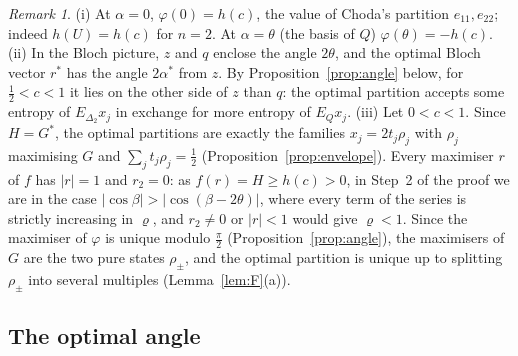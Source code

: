 \documentclass[11pt]{article}
\theoremstyle{plain}
\theoremstyle{definition}
\theoremstyle{remark}
\newtheorem{remark}[theorem]{Remark}
\begin{document}
\begin{remark}\label{rem:n2}
(i) At $\alpha=0$, $\varphi(0)=h(c)$, the value of Choda's partition $e_{11},e_{22}$; indeed $h(U)=h(c)$ for $n=2$. At $\alpha=\theta$
(the basis of $Q$) $\varphi(\theta)=-h(c)$.
(ii) In the Bloch picture, $z$ and $q$ enclose the angle $2\theta$, and the optimal Bloch vector $r^*$ has the angle $2\alpha^*$ from
$z$. By Proposition~\ref{prop:angle} below, for $\frac12<c<1$ it lies on the other side of $z$ than $q$: the optimal partition
accepts some entropy of $E_{\Delta_2}x_j$ in exchange for more entropy of $E_Qx_j$.
(iii) Let $0<c<1$. Since $H=G^*$, the optimal partitions are exactly the families $x_j=2t_j\rho_j$ with $\rho_j$ maximising
$G$ and $\sum_jt_j\rho_j=\frac12$ (Proposition~\ref{prop:envelope}). Every maximiser $r$ of $f$ has $|r|=1$ and $r_2=0$: as
$f(r)=H\ge h(c)>0$, in Step~2 of the proof we are in the case $|\cos\beta|>|\cos(\beta-2\theta)|$, where every term of the
series is strictly increasing in $\varrho$, and $r_2\ne0$ or $|r|<1$ would give $\varrho<1$. Since the maximiser of $\varphi$ is
unique modulo $\frac\pi2$ (Proposition~\ref{prop:angle}), the maximisers of $G$ are the two pure states $\rho_\pm$, and the
optimal partition is unique up to splitting $\rho_\pm$ into several multiples (Lemma~\ref{lem:F}(a)).
\end{remark}

\subsection{The optimal angle}
\end{document}
